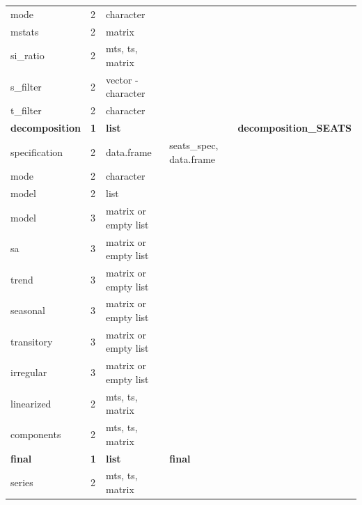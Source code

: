 \documentclass[article]{jss}
\begin{document}
\begin{longtable}{lllll}
\hspace{2em}mode & 2 & character &  \vphantom{1} & \\
\addlinespace
\hspace{2em}mstats & 2 & matrix &  & \\
\hspace{2em}si\_ratio & 2 & mts, ts, matrix &  & \\
\hspace{2em}s\_filter & 2 & vector - character &  & \\
\hspace{2em}t\_filter & 2 & character &  & \\
\textbf{\hspace{1em}decomposition} & \textbf{1} & \textbf{list} & \textbf{} & \textbf{decomposition\_SEATS}\\
\addlinespace
\hspace{2em}specification & 2 & data.frame & seats\_spec, data.frame & \\
\hspace{2em}mode & 2 & character &  & \\
\hspace{2em}model & 2 & list &  & \\
\hspace{3em}model & 3 & matrix or empty list &  & \\
\hspace{3em}sa & 3 & matrix or empty list &  & \\
\addlinespace
\hspace{3em}trend & 3 & matrix or empty list &  & \\
\hspace{3em}seasonal & 3 & matrix or empty list &  & \\
\hspace{3em}transitory & 3 & matrix or empty list &  & \\
\hspace{3em}irregular & 3 & matrix or empty list &  & \\
\hspace{2em}linearized & 2 & mts, ts, matrix &  & \\
\addlinespace
\hspace{2em}components & 2 & mts, ts, matrix &  & \\
\textbf{\hspace{1em}final} & \textbf{1} & \textbf{list} & \textbf{final} & \textbf{}\\
\hspace{2em}series & 2 & mts, ts, matrix &  & \\

\end{longtable}
\end{document}
